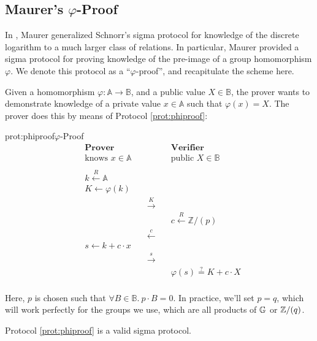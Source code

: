 \subsection{Maurer's \texorpdfstring{$\varphi$}{varphi}-Proof}

In \cite{maurer_unifying_2009}, Maurer generalized Schnorr's sigma 
protocol for knowledge of the discrete logarithm \cite{schnorr_efficient_1990} to a much larger class
of relations. In particular, Maurer provided a sigma protocol for
proving knowledge of the pre-image of a group homomorphism $\varphi$.
We denote this protocol as a ``$\varphi$-proof'', and recapitulate the scheme
here.

Given a homomorphism $\varphi : \mathbb{A} \to \mathbb{B}$, and a public value
$X \in \mathbb{B}$, the prover wants to demonstrate knowledge of a private
value $x \in \mathbb{A}$ such that $\varphi(x) = X$. The prover
does this by means of Protocol \ref{prot:phiproof}:

\begin{aprotocol}{prot:phiproof}{$\varphi$-Proof}
\[
\begin{aligned}
    &\textbf{Prover}&&\textbf{Verifier}\\
    &\text{knows } x \in \mathbb{A}&&\text{public } X \in \mathbb{B}\\
    \\
    &k \xleftarrow{R} \mathbb{A}&\\
    &K \gets \varphi(k)&\\
    &&\quad\overset{K}{\longrightarrow}\quad\\
    &&&c \xleftarrow{R} \mathbb{Z}/(p)\\
    &&\quad\overset{c}{\longleftarrow}\quad\\
    &s \gets k + c \cdot x\\
    &&\quad\overset{s}{\longrightarrow}\quad\\
    &&& \varphi(s) \overset{?}{=} K + c \cdot X\\
\end{aligned}
\]
\end{aprotocol}

Here, $p$ is chosen such that $\forall B \in \mathbb{B}.\ p \cdot B = 0$.
In practice, we'll set $p = q$, which will work perfectly for the groups
we use, which are all products of $\mathbb{G}$ or $\mathbb{Z}/(q)$.

\begin{claim}
    Protocol \ref{prot:phiproof} is a valid sigma protocol.
\end{claim}

